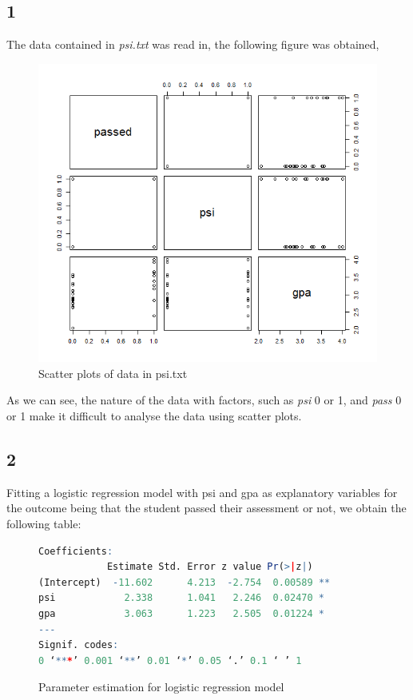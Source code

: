 \documentclass{article}
\begin{document}
    \subsection*{1}
    The data contained in \textit{psi.txt} was read in, the following figure was obtained,
    
      \begin{figure}[H]
          \centering
          \includegraphics[scale=0.3]{../results/2_1.png}
          \caption{Scatter plots of data in psi.txt}
      \end{figure}
      
      As we can see, the nature of the data with factors, such as \textit{psi} 0 or 1, and \textit{pass} 0 or 1 make it difficult to analyse the data using scatter plots.    
    
    \subsection*{2}
    Fitting a logistic regression model with psi and gpa as explanatory variables for the outcome being that the student passed their assessment or not, we obtain the following table:
    	\begin{figure}[H]
    	\begin{lstlisting}[language=R]
	Coefficients:
            Estimate Std. Error z value Pr(>|z|)   
(Intercept)  -11.602      4.213  -2.754  0.00589 **
psi            2.338      1.041   2.246  0.02470 * 
gpa            3.063      1.223   2.505  0.01224 * 
---
Signif. codes:  
0 ‘***’ 0.001 ‘**’ 0.01 ‘*’ 0.05 ‘.’ 0.1 ‘ ’ 1
    	\end{lstlisting}
    	\caption{Parameter estimation for logistic regression model}
    	\label{fig:log_reg}
    \end{figure}
    
\end{document}
